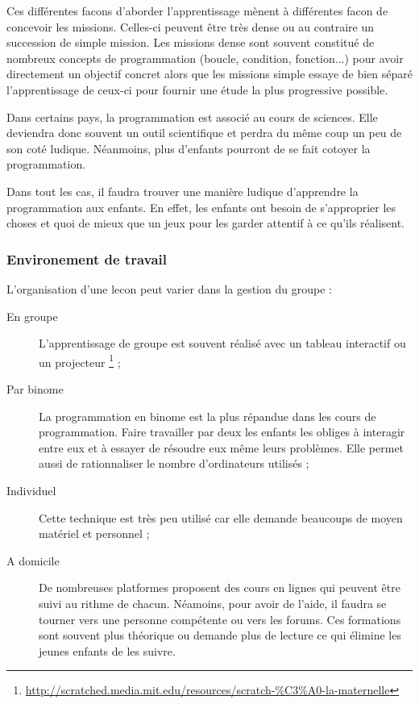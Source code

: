 Ces différentes facons d'aborder l'apprentissage mènent à différentes facon de concevoir les missions. Celles-ci peuvent être très dense ou au contraire un succession de simple mission. Les missions dense sont souvent constitué de nombreux concepts de programmation (boucle, condition, fonction...) pour avoir directement un objectif concret alors que les missions simple essaye de bien séparé l'apprentissage de ceux-ci pour fournir une étude la plus progressive possible.

Dans certains pays, la programmation est associé au cours de sciences. Elle deviendra donc souvent un outil scientifique et perdra du même coup un peu de son coté ludique. Néanmoins, plus d'enfants pourront de se fait cotoyer la programmation.

Dans tout les cas, il faudra trouver une manière ludique d'apprendre la programmation aux enfants. En effet, les enfants ont besoin de s'approprier les choses et quoi de mieux que un jeux pour les garder attentif à ce qu'ils réalisent.

\subsubsection{Environement de travail}
L'organisation d'une lecon peut varier dans la gestion du groupe :
\begin{description}
  \item[En groupe] L'apprentissage de groupe est souvent réalisé avec un tableau interactif ou un projecteur \footnote{\url{http://scratched.media.mit.edu/resources/scratch-\%C3\%A0-la-maternelle}} ;
  \item[Par binome] La programmation en binome est la plus répandue dans les cours de programmation. Faire travailler par deux les enfants les obliges à interagir entre eux et à essayer de résoudre eux même leurs problèmes. Elle permet aussi de rationnaliser le nombre d'ordinateurs utilisés ;
  \item[Individuel] Cette technique est très peu utilisé car elle demande beaucoups de moyen matériel et personnel ;
  \item[A domicile] De nombreuses platformes proposent des cours en lignes qui peuvent être suivi au rithme de chacun. Néamoins, pour avoir de l'aide, il faudra se tourner vers une personne compétente ou vers les forums. Ces formations sont souvent plus théorique ou demande plus de lecture ce qui élimine les jeunes enfants de les suivre.
\end{description}

